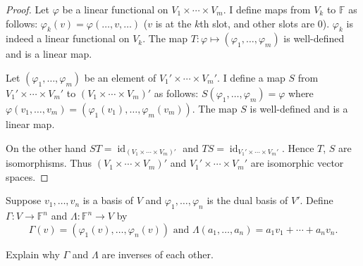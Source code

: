 \begin{proof}
    Let $\varphi$ be a linear functional on $V_{1} \times \cdots \times V_{m}$. I define maps from $V_{k}$ to $\mathbb{F}$ as follows: $\varphi_{k}(v) = \varphi(\ldots, v, \ldots)$ ($v$ is at the $k$th slot, and other slots are $0$). $\varphi_{k}$ is indeed a linear functional on $V_{k}$. The map $T: \varphi\mapsto (\varphi_{1}, \ldots, \varphi_{m})$ is well-defined and is a linear map.

    Let $(\varphi_{1}, \ldots, \varphi_{m})$ be an element of $V_{1}' \times \cdots \times V_{m}'$. I define a map $S$ from $V_{1}' \times \cdots \times V_{m}'$ to ${(V_{1} \times \cdots \times V_{m})}'$ as follows: $S(\varphi_{1}, \ldots, \varphi_{m}) = \varphi$ where $\varphi(v_{1}, \ldots, v_{m}) = (\varphi_{1}(v_{1}), \ldots, \varphi_{m}(v_{m}))$. The map $S$ is well-defined and is a linear map.

    On the other hand $ST = \operatorname{id}_{{(V_{1} \times \cdots \times V_{m})}'}$ and $TS = \operatorname{id}_{V_{1}' \times \cdots \times V_{m}'}$. Hence $T$, $S$ are isomorphisms. Thus ${(V_{1} \times \cdots \times V_{m})}'$ and $V_{1}' \times \cdots \times V_{m}'$ are isomorphic vector spaces.
\end{proof}
\newpage

\begin{exercise}
    Suppose $v_{1} , \ldots, v_{n}$ is a basis of $V$ and $\varphi_{1}, \ldots, \varphi_{n}$ is the dual basis of $V'$. Define $\Gamma: V\to \mathbb{F}^{n}$ and $\Lambda: \mathbb{F}^{n}\to V$ by
    \[
        \Gamma(v) = (\varphi_{1}(v), \ldots, \varphi_{n}(v)) \text{  and  } \Lambda(a_{1}, \ldots, a_{n}) = a_{1}v_{1} + \cdots + a_{n}v_{n}.
    \]

    Explain why $\Gamma$ and $\Lambda$ are inverses of each other.
\end{exercise}

